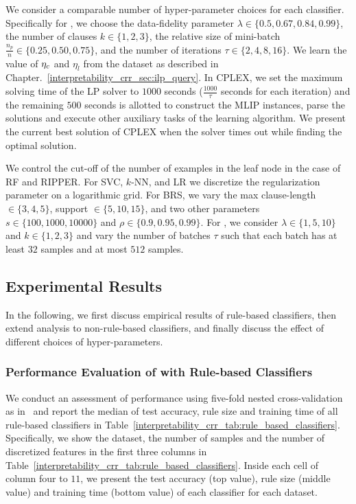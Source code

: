 


We consider a comparable number  of hyper-parameter choices  for each classifier. Specifically for {\crr}, we choose the data-fidelity parameter $ \lambda \in \{0.5, 0.67, 0.84, 0.99\} $, the number of clauses $ k \in \{1,2,3\} $, the relative size of mini-batch $ \frac{n_p}{n} \in \{0.25, 0.50, 0.75\} $, and the number of iterations $ \tau \in \{2,4,8,16\} $. We learn the value of $ \eta_c $ and $ \eta_{l} $ from the dataset as described in Chapter.~\ref{interpretability_crr_sec:ilp_query}.  In CPLEX, we set the  maximum solving time of the LP solver to $ 1000 $  seconds ($ \frac{ 1000 }{\tau} $ seconds for each iteration) and the remaining $ 500 $ seconds is allotted to construct the MLIP instances, parse the solutions and execute  other auxiliary tasks of the learning algorithm. We present the current best solution of CPLEX when the solver times out while finding the optimal solution.  

We control the cut-off of the number of examples in the leaf node in the case of RF and RIPPER. For SVC, $ k $-NN, and LR we discretize the regularization parameter on a logarithmic grid. For BRS, we vary the max clause-length $ \in \{3,4,5\} $, support $ \in  \{5,10,15\} $, and two other parameters $ s \in \{100,1000,10000\} $ and $ \rho \in \{0.9,0.95,0.99\} $.  For  {\IMLI}, we consider  $ \lambda \in \{1,5,10\} $ and  $ k \in \{1,2,3\} $ and  vary the number of batches $ \tau $ such that each batch has at least $ 32 $ samples and at most $ 512 $ samples.  




	








\subsection{Experimental Results}
In the following, we first discuss empirical results of rule-based classifiers, then extend analysis to non-rule-based classifiers, and finally discuss the effect of different choices of hyper-parameters. 
\subsubsection{Performance Evaluation of {\crr} with Rule-based Classifiers}
We conduct an assessment of performance  using five-fold nested cross-validation as in~\cite{DGW2018}  and report the median of test accuracy, rule size and training time of all rule-based classifiers in Table~\ref{interpretability_crr_tab:rule_based_classifiers}. 
Specifically, we show the dataset,  the number of samples and the number of discretized features in the first three columns in Table~\ref{interpretability_crr_tab:rule_based_classifiers}. Inside each cell of column   four to $    11 $,  we present the   test accuracy (top value), rule size (middle value) and training time (bottom value) of each classifier for each dataset. 



